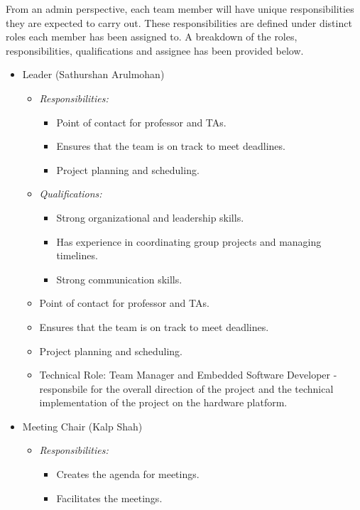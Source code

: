 \documentclass{article}
\begin{document}
From an admin perspective, each team member will have unique responsibilities
they are expected to carry out. These responsibilities are defined under 
distinct roles each member has been assigned to. A breakdown of the roles, 
responsibilities, qualifications and assignee has been provided below. 

\begin{itemize}
  \item Leader (Sathurshan Arulmohan) \label{role:leader}
    \begin{itemize}
      \item \textit{Responsibilities:}
        \begin{itemize}
          \item Point of contact for professor and TAs. 
          \item Ensures that the team is on track to meet deadlines.
          \item Project planning and scheduling.
        \end{itemize}
      \item \textit{Qualifications:}
        \begin{itemize}
          \item Strong organizational and leadership skills. 
          \item Has experience in coordinating group projects and managing
          timelines. 
          \item Strong communication skills. 
        \end{itemize}
      \item Point of contact for professor and TAs. 
      \item Ensures that the team is on track to meet deadlines.
      \item Project planning and scheduling.
      \item Technical Role: Team Manager and Embedded Software Developer - 
      responsbile for the overall direction of the project and the technical 
      implementation of the project on the hardware platform.
    \end{itemize}
  \item Meeting Chair (Kalp Shah)
    \begin{itemize}
      \item \textit{Responsibilities:}
        \begin{itemize}
          \item Creates the agenda for meetings.
          \item Facilitates the meetings.

\end{itemize}
\end{itemize}
\end{itemize}
\end{document}
